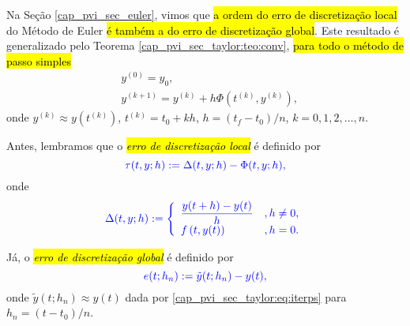Na Seção \ref{cap_pvi_sec_euler}, vimos que \hl{a ordem do erro de discretização local} do Método de Euler{\euler} \hl{é também a do erro de discretização global}. Este resultado é generalizado pelo Teorema \ref{cap_pvi_sec_taylor:teo:conv}, \hl{para todo o método de passo simples}
\begin{subequations}\label{cap_pvi_sec_taylor:eq:iterps}
  \begin{align}
    &y^{(0)} = y_0,\\
    &y^{(k+1)} = y^{(k)} + h\Phi\left(t^{(k)}, y^{(k)}\right),
  \end{align}
\end{subequations}
onde $y^{(k)}\approx y\left(t^{(k)}\right)$, $t^{(k)} = t_0 + kh$, $h = (t_f-t_0)/n$, $k = 0, 1, 2, \dotsc, n$.

Antes, lembramos que o \hl{\emph{erro de discretização local}} é definido por
\begin{equation}\label{cap_pvi_sec_taylor:eq:def_erro_local}\color{blue}\tau(t, y; h) := \Delta(t, y; h) - \Phi(t, y; h),
\end{equation}
onde
\begin{equation}\color{blue}\Delta(t, y; h) := \left\{
    \begin{array}{ll}
      \displaystyle\frac{y(t+h) - y(t)}{h} &, h\neq 0,\\
      f\left(t, y(t)\right) &, h=0.
    \end{array}
  \right.
\end{equation}

Já, o \hl{\emph{erro de discretização global}} é definido por
\begin{equation}\color{blue}e(t; h_n) := \tilde{y}(t; h_n) - y(t),
\end{equation}
onde $\tilde{y}(t; h_n) \approx y(t)$ dada por \eqref{cap_pvi_sec_taylor:eq:iterps} para $h_n = (t-t_0)/n$.

